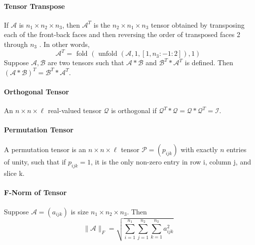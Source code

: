 \documentclass[english]{article}
\newcommand{\<}{\langle}
\renewcommand{\>}{\rangle}
\theoremstyle{definition}
\begin{document}
\paragraph{Tensor Transpose} If  $\mathcal{A}$  is  $n_{1} \times n_{2} \times n_{3}$,  then  $\mathcal{A}^{T}$  is the $ n_{2} \times n_{1} \times n_{3}$  tensor obtained by transposing each of the front-back faces and then reversing the order of transposed faces 2 through  $n_{3}$ . In other words,
$$\mathcal{A}^{T}=\text { fold }\left(\text { unfold }\left(\mathcal{A}, 1,\left[1, n_{3}:-1: 2\right]\right), 1\right)$$
   Suppose  $\mathcal{A}, \mathcal{B}$  are two tensors such that  $\mathcal{A} * \mathcal{B}$  and  $\mathcal{B}^{T} * \mathcal{A}^{T}$  is defined. Then  $(\mathcal{A} * \mathcal{B})^{T}=\mathcal{B}^{T} * \mathcal{A}^{T}$.
\paragraph{Orthogonal Tensor} An $ n \times n \times \ell $ real-valued tensor $ \mathcal{Q} $ is orthogonal if $ \mathcal{Q}^{T} * \mathcal{Q}= \mathcal{Q} * \mathcal{Q}^{T}=\mathcal{I}$.
\paragraph{Permutation Tensor} A permutation tensor is an $ n \times n \times \ell $ tensor  $\mathcal{P}=\left(p_{i j k}\right)$  with exactly $ n $ entries of unity, such that if  $p_{i j k}=1$,  it is the only non-zero entry in row i, column j, and slice k.
\paragraph{F-Norm of Tensor} Suppose $\mathcal{A}=\left(a_{i j k}\right)$ is size $ n_{1} \times n_{2} \times n_{3} $.  Then
$$ \|\mathcal{A}\|_{F}=\sqrt{\sum_{i=1}^{n_{1}} \sum_{j=1}^{n_{2}} \sum_{k=1}^{n_{3}} a_{i j k}^{2}} $$
\end{document}
